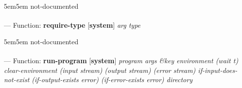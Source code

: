 \begin{adjustwidth}{5em}{5em}
not-documented
\end{adjustwidth}

\paragraph{}
\label{SYSTEM:REQUIRE-TYPE}
--- Function: \textbf{require-type} [\textbf{system}] \textit{arg type}

\begin{adjustwidth}{5em}{5em}
not-documented
\end{adjustwidth}

\paragraph{}
\label{SYSTEM:RUN-PROGRAM}
--- Function: \textbf{run-program} [\textbf{system}] \textit{program args \&key environment (wait t) clear-environment (input stream) (output stream) (error stream) if-input-does-not-exist (if-output-exists error) (if-error-exists error) directory}

